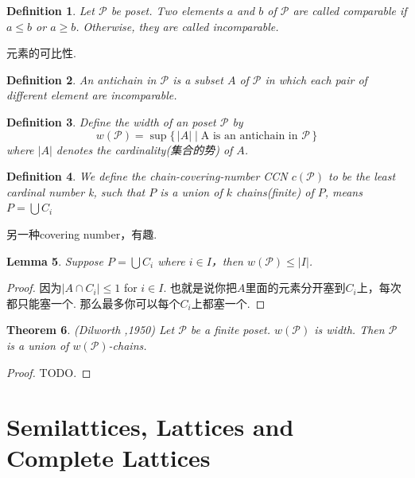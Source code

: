 \documentclass{article}
\newtheorem{theorem}{Theorem}[section]
\newtheorem{lemma}[theorem]{Lemma}
\newtheorem{definition}[theorem]{Definition}
\newcommand\Set[2]{\{\,#1\mid#2\,\}} %
\begin{document}
\begin{definition}
\rm Let $\mathcal{P}$ be poset. Two elements $a$ and $b$ of $\mathcal{P}$ are called {\color{red} comparable} if $a \leq b$ or $a \geq b$. Otherwise, they are called {\color{red}incomparable}.
\end{definition}

{\color{blue} 元素的可比性}.

\begin{definition}
\rm An {\color{red} antichain} in $\mathcal{P}$ is a subset $A$ of $\mathcal{P}$ in which each pair of different element are incomparable.
\end{definition}

\begin{definition}
\rm Define the {\color{red} width} of an poset $\mathcal{P}$ by
$$
	w(\mathcal{P}) = \sup\Set{|A|}{\text{A is an antichain in $\mathcal{P}$}}
$$
where $|A|$ denotes the cardinality(集合的势) of $A$. 
\end{definition}


\begin{definition}
\rm We define the {\color{red} chain-covering-number} CCN $c(\mathcal{P})$ to be the least cardinal number k, such that $P$ is a union of $k$ chains(finite) of $P$, means $P = \bigcup C_i$
\end{definition}

{\color{blue} 另一种covering number，有趣}.

\begin{lemma}
Suppose $P = \bigcup C_i$ where $i \in I$，then $ w(\mathcal{P}) \leq |I|$.
\end{lemma}

\begin{proof}
因为$ |A \cap C_i| \leq 1 $ for $i \in I$. 也就是说你把$A$里面的元素分开塞到$C_i$上，每次都只能塞一个. 那么最多你可以每个$C_i$上都塞一个. 
\end{proof}

\begin{theorem}
\rm (Dilworth ,1950) Let $\mathcal{P}$ be a finite poset. $w(\mathcal{P})$ is width. Then $\mathcal{P}$ is a union of $w(\mathcal{P})$-chains.
\end{theorem}

\begin{proof}
TODO.
\end{proof}

\newpage
\section{Semilattices, Lattices and Complete Lattices}
\end{document}
